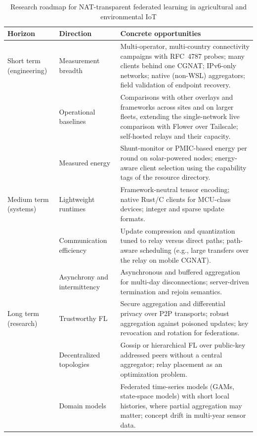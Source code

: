\begin{table}[t]
\centering
\caption{Research roadmap for NAT-transparent federated learning in agricultural and environmental IoT}
\label{tab:roadmap}
\footnotesize
\renewcommand{\arraystretch}{1.2}
\begin{tabular}{p{2.4cm} p{5.6cm} p{7.4cm}}
\toprule
\textbf{Horizon} & \textbf{Direction} & \textbf{Concrete opportunities} \\
\midrule
Short term (engineering) & Measurement breadth & Multi-operator, multi-country connectivity campaigns with RFC~4787 probes; many clients behind one CGNAT; IPv6-only networks; native (non-WSL) aggregators; field validation of endpoint recovery. \\
 & Operational baselines & Comparisons with other overlays and frameworks across sites and on larger fleets, extending the single-network live comparison with Flower over Tailscale; self-hosted relays and their capacity. \\
 & Measured energy & Shunt-monitor or PMIC-based energy per round on solar-powered nodes; energy-aware client selection using the capability tags of the resource directory. \\
\midrule
Medium term (systems) & Lightweight runtimes & Framework-neutral tensor encoding; native Rust/C clients for MCU-class devices; integer and sparse update formats. \\
 & Communication efficiency & Update compression and quantization tuned to relay versus direct paths; path-aware scheduling (e.g., large transfers over the relay on mobile CGNAT). \\
 & Asynchrony and intermittency & Asynchronous and buffered aggregation for multi-day disconnections; server-driven termination and rejoin semantics. \\
\midrule
Long term (research) & Trustworthy FL & Secure aggregation and differential privacy over P2P transports; robust aggregation against poisoned updates; key revocation and rotation for federations. \\
 & Decentralized topologies & Gossip or hierarchical FL over public-key addressed peers without a central aggregator; relay placement as an optimization problem. \\
 & Domain models & Federated time-series models (GAMs, state-space models) with short local histories, where partial aggregation may matter; concept drift in multi-year sensor data. \\
\bottomrule
\end{tabular}
\end{table}
